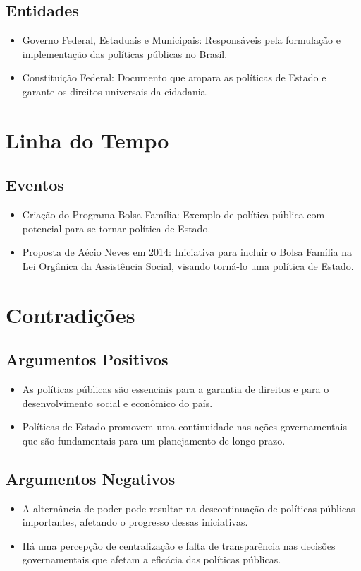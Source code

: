 \documentclass[
   article,       
   12pt,          
   oneside,       
   a4paper,       
   english,       
   brazil,        
   sumario=tradicional
   ]{abntex2}
\begin{document}
\subsection{Entidades}
\begin{itemize}
    \item Governo Federal, Estaduais e Municipais: Responsáveis pela formulação e implementação das políticas públicas no Brasil.
    \item Constituição Federal: Documento que ampara as políticas de Estado e garante os direitos universais da cidadania.
\end{itemize}
\section{Linha do Tempo}
\subsection{Eventos}
\begin{itemize}
    \item Criação do Programa Bolsa Família: Exemplo de política pública com potencial para se tornar política de Estado.
    \item Proposta de Aécio Neves em 2014: Iniciativa para incluir o Bolsa Família na Lei Orgânica da Assistência Social, visando torná-lo uma política de Estado.
\end{itemize}
\section{Contradições}
\subsection{Argumentos Positivos}
\begin{itemize}
    \item As políticas públicas são essenciais para a garantia de direitos e para o desenvolvimento social e econômico do país.
    \item Políticas de Estado promovem uma continuidade nas ações governamentais que são fundamentais para um planejamento de longo prazo.
\end{itemize}
\subsection{Argumentos Negativos}
\begin{itemize}
    \item A alternância de poder pode resultar na descontinuação de políticas públicas importantes, afetando o progresso dessas iniciativas.
    \item Há uma percepção de centralização e falta de transparência nas decisões governamentais que afetam a eficácia das políticas públicas.
\end{itemize}
\end{document}
